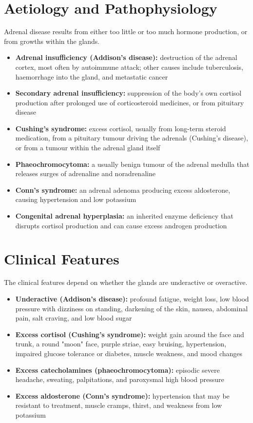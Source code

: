 \section*{Aetiology and Pathophysiology}
Adrenal disease results from either too little or too much hormone production, or from growths within the glands.

\begin{itemize}
    \item \textbf{Adrenal insufficiency (Addison's disease):} destruction of the adrenal cortex, most often by autoimmune attack; other causes include tuberculosis, haemorrhage into the gland, and metastatic cancer
    \item \textbf{Secondary adrenal insufficiency:} suppression of the body's own cortisol production after prolonged use of corticosteroid medicines, or from pituitary disease
    \item \textbf{Cushing's syndrome:} excess cortisol, usually from long-term steroid medication, from a pituitary tumour driving the adrenals (Cushing's disease), or from a tumour within the adrenal gland itself
    \item \textbf{Phaeochromocytoma:} a usually benign tumour of the adrenal medulla that releases surges of adrenaline and noradrenaline
    \item \textbf{Conn's syndrome:} an adrenal adenoma producing excess aldosterone, causing hypertension and low potassium
    \item \textbf{Congenital adrenal hyperplasia:} an inherited enzyme deficiency that disrupts cortisol production and can cause excess androgen production
\end{itemize}

\section*{Clinical Features}
The clinical features depend on whether the glands are underactive or overactive.

\begin{itemize}
    \item \textbf{Underactive (Addison's disease):} profound fatigue, weight loss, low blood pressure with dizziness on standing, darkening of the skin, nausea, abdominal pain, salt craving, and low blood sugar
    \item \textbf{Excess cortisol (Cushing's syndrome):} weight gain around the face and trunk, a round "moon" face, purple striae, easy bruising, hypertension, impaired glucose tolerance or diabetes, muscle weakness, and mood changes
    \item \textbf{Excess catecholamines (phaeochromocytoma):} episodic severe headache, sweating, palpitations, and paroxysmal high blood pressure
    \item \textbf{Excess aldosterone (Conn's syndrome):} hypertension that may be resistant to treatment, muscle cramps, thirst, and weakness from low potassium
\end{itemize}


